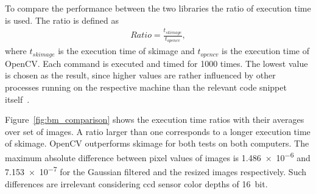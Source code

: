 To compare the performance between the two libraries the ratio of execution time is used. The ratio is defined as
\begin{align}
    Ratio = \frac{t_{skimage}}{t_{opencv}}, \label{eq:bm_exec_ratio}
\end{align}
where $t_{skimage}$ is the execution time of \gls{skimage} and $t_{opencv}$ is the execution time of OpenCV. Each command is executed and timed for 1000 times. The lowest value is chosen as the result, since higher values are rather influenced by other processes running on the respective machine than the relevant code snippet itself~\cite{timeit2020}.

Figure~\ref{fig:bm_comparison} shows the execution time ratios with their averages over set of images. A ratio larger than one corresponds to a longer execution time of \gls{skimage}. OpenCV outperforms \gls{skimage} for both tests on both computers. The maximum absolute difference between pixel values of images is \SI{1.486e-6}{} and \SI{7.153e-7}{} for the Gaussian filtered and the resized images respectively. Such differences are irrelevant considering \gls{ccd} sensor color depths of \SI{16}{bit}.


